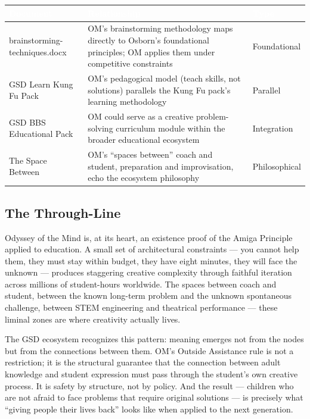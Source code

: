 \documentclass[11pt,letterpaper]{article}
\newcommand{\tableheader}[1]{\textbf{\sffamily\textcolor{white}{#1}}}
\begin{document}
\begin{center}
\begin{tabularx}{\textwidth}{L{4cm}XC{2.5cm}}
\toprule
{}
\tableheader{Document} & \tableheader{Relationship} & \tableheader{Type} \\
\midrule
brainstorming-techniques.docx & OM's brainstorming methodology maps directly to Osborn's foundational principles; OM applies them under competitive constraints & Foundational \\
GSD Learn Kung Fu Pack & OM's pedagogical model (teach skills, not solutions) parallels the Kung Fu pack's learning methodology & Parallel \\
GSD BBS Educational Pack & OM could serve as a creative problem-solving curriculum module within the broader educational ecosystem & Integration \\
The Space Between & OM's ``spaces between'' coach and student, preparation and improvisation, echo the ecosystem philosophy & Philosophical \\
\bottomrule
\end{tabularx}
\end{center}

\subsection{The Through-Line}

Odyssey of the Mind is, at its heart, an existence proof of the Amiga Principle applied to education. A small set of architectural constraints --- you cannot help them, they must stay within budget, they have eight minutes, they will face the unknown --- produces staggering creative complexity through faithful iteration across millions of student-hours worldwide. The spaces between coach and student, between the known long-term problem and the unknown spontaneous challenge, between STEM engineering and theatrical performance --- these liminal zones are where creativity actually lives.

The GSD ecosystem recognizes this pattern: meaning emerges not from the nodes but from the connections between them. OM's Outside Assistance rule is not a restriction; it is the structural guarantee that the connection between adult knowledge and student expression must pass through the student's own creative process. It is safety by structure, not by policy. And the result --- children who are not afraid to face problems that require original solutions --- is precisely what ``giving people their lives back'' looks like when applied to the next generation.
\end{document}
